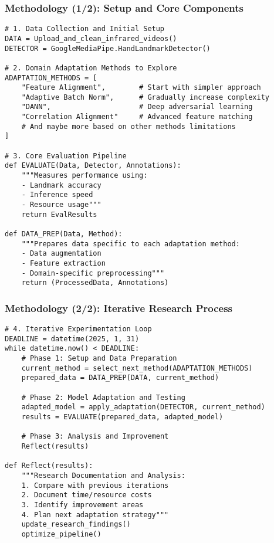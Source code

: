 \documentclass{beamer}
\begin{document}
\begin{frame}[fragile]
    \frametitle{Methodology (1/2): Setup and Core Components}
    \lstset{style=customcode}
    \begin{lstlisting}
# 1. Data Collection and Initial Setup
DATA = Upload_and_clean_infrared_videos()
DETECTOR = GoogleMediaPipe.HandLandmarkDetector()

# 2. Domain Adaptation Methods to Explore
ADAPTATION_METHODS = [
    "Feature Alignment",        # Start with simpler approach
    "Adaptive Batch Norm",      # Gradually increase complexity
    "DANN",                     # Deep adversarial learning
    "Correlation Alignment"     # Advanced feature matching
    # And maybe more based on other methods limitations
]

# 3. Core Evaluation Pipeline
def EVALUATE(Data, Detector, Annotations):
    """Measures performance using:
    - Landmark accuracy
    - Inference speed
    - Resource usage"""
    return EvalResults

def DATA_PREP(Data, Method):
    """Prepares data specific to each adaptation method:
    - Data augmentation
    - Feature extraction
    - Domain-specific preprocessing"""
    return (ProcessedData, Annotations)
    \end{lstlisting}
\end{frame}

\begin{frame}[fragile]
    \frametitle{Methodology (2/2): Iterative Research Process}
    \lstset{style=customcode}
    \begin{lstlisting}
# 4. Iterative Experimentation Loop
DEADLINE = datetime(2025, 1, 31)
while datetime.now() < DEADLINE:
    # Phase 1: Setup and Data Preparation
    current_method = select_next_method(ADAPTATION_METHODS)
    prepared_data = DATA_PREP(DATA, current_method)
    
    # Phase 2: Model Adaptation and Testing
    adapted_model = apply_adaptation(DETECTOR, current_method)
    results = EVALUATE(prepared_data, adapted_model)
    
    # Phase 3: Analysis and Improvement
    Reflect(results)

def Reflect(results):
    """Research Documentation and Analysis:
    1. Compare with previous iterations
    2. Document time/resource costs
    3. Identify improvement areas
    4. Plan next adaptation strategy"""
    update_research_findings()
    optimize_pipeline()
    \end{lstlisting}
\end{frame}
\end{document}
